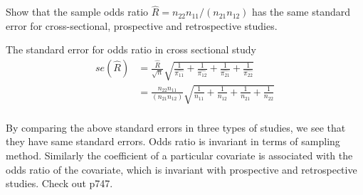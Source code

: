	Show that the sample odds ratio $\hat R = n_{22}n_{11}/(n_{21}n_{12})$ has the same standard error for cross-sectional, prospective and retrospective studies.
	
	
	The standard error for odds ratio in cross sectional study\\
	\begin{align*}
		se(\hat R) &= \frac{\hat{R}}{\sqrt{n}} \sqrt{\frac{1}{\hat{\pi_{11}}} + \frac{1}{\hat{\pi_{12}}} + \frac{1}{\hat{\pi_{21}}} + \frac{1}{\hat{\pi_{22}}}}\\
		&= \frac{{n_{22}n_{11}}}{(n_{21}n_{12})} \sqrt{\frac{1}{n_{11}} + \frac{1}{n_{12}} + \frac{1}{n_{21}} + \frac{1}{n_{22}}}\\
	\end{align*}

	
	By comparing the above standard errors in three types of studies, we see that they have same standard errors. Odds ratio is invariant in terms of sampling method. 
Similarly the coefficient of a particular covariate is associated with the odds ratio of the covariate, which is invariant with prospective and retrospective studies. Check out p747.




